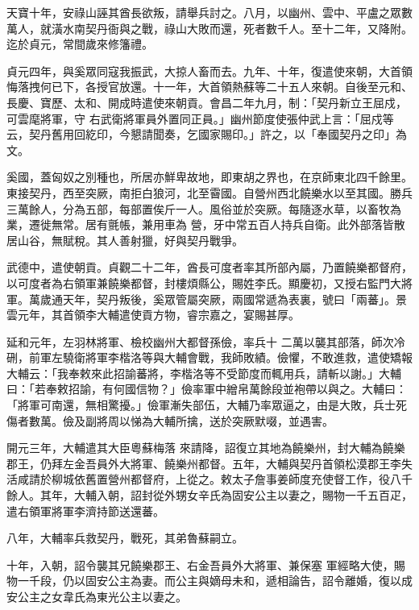 \begin{pinyinscope}
 天寶十年，安祿山誣其酋長欲叛，請舉兵討之。八月，以幽州、雲中、平盧之眾數萬人，就潢水南契丹衙與之戰，祿山大敗而還，死者數千人。至十二年，又降附。迄於貞元，常間歲來修籓禮。



 貞元四年，與奚眾同寇我振武，大掠人畜而去。九年、十年，復遣使來朝，大首領悔落拽何已下，各授官放還。十一年，大首領熱蘇等二十五人來朝。自後至元和、長慶、寶歷、太和、開成時遣使來朝貢。會昌二年九月，制：「契丹新立王屈戍，可雲麾將軍，守
 右武衛將軍員外置同正員。」幽州節度使張仲武上言：「屈戍等云，契丹舊用回紇印，今懇請聞奏，乞國家賜印。」許之，以「奉國契丹之印」為文。



 奚國，蓋匈奴之別種也，所居亦鮮卑故地，即東胡之界也，在京師東北四千餘里。東接契丹，西至突厥，南拒白狼河，北至霫國。自營州西北饒樂水以至其國。勝兵三萬餘人，分為五部，每部置俟斤一人。風俗並於突厥。每隨逐水草，以畜牧為業，遷徙無常。居有氈帳，兼用車為
 營，牙中常五百人持兵自衛。此外部落皆散居山谷，無賦稅。其人善射獵，好與契丹戰爭。



 武德中，遣使朝貢。貞觀二十二年，酋長可度者率其所部內屬，乃置饒樂都督府，以可度者為右領軍兼饒樂都督，封樓煩縣公，賜姓李氏。顯慶初，又授右監門大將軍。萬歲通天年，契丹叛後，奚眾管屬突厥，兩國常遞為表裏，號曰「兩蕃」。景雲元年，其首領李大輔遣使貢方物，睿宗嘉之，宴賜甚厚。



 延和元年，左羽林將軍、檢校幽州大都督孫儉，率兵十
 二萬以襲其部落，師次冷硎，前軍左驍衛將軍李楷洛等與大輔會戰，我師敗績。儉懼，不敢進救，遣使矯報大輔云：「我奉敕來此招諭蕃將，李楷洛等不受節度而輒用兵，請斬以謝。」大輔曰：「若奉敕招諭，有何國信物？」儉率軍中繒帛萬餘段並袍帶以與之。大輔曰：「將軍可南還，無相驚擾。」儉軍漸失部伍，大輔乃率眾逼之，由是大敗，兵士死傷者數萬。儉及副將周以悌為大輔所擒，送於突厥默啜，並遇害。



 開元三年，大輔遣其大臣粵蘇梅落
 來請降，詔復立其地為饒樂州，封大輔為饒樂郡王，仍拜左金吾員外大將軍、饒樂州都督。五年，大輔與契丹首領松漠郡王李失活咸請於柳城依舊置營州都督府，上從之。敕太子詹事姜師度充使督工作，役八千餘人。其年，大輔入朝，詔封從外甥女辛氏為固安公主以妻之，賜物一千五百疋，遣右領軍將軍李濟持節送還蕃。



 八年，大輔率兵救契丹，戰死，其弟魯蘇嗣立。



 十年，入朝，詔令襲其兄饒樂郡王、右金吾員外大將軍、兼保塞
 軍經略大使，賜物一千段，仍以固安公主為妻。而公主與嫡母未和，遞相論告，詔令離婚，復以成安公主之女韋氏為東光公主以妻之。




\end{pinyinscope}
